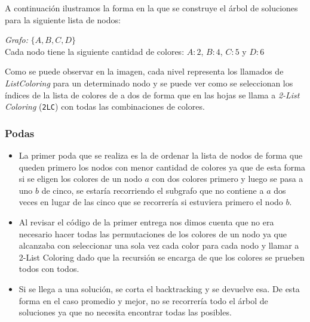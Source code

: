 A continuación ilustramos la forma en la que se construye el árbol de soluciones para la siguiente lista de nodos:

\begin{center}
\emph{Grafo:} $\{ A, B, C, D \}$\\
Cada nodo tiene la siguiente cantidad de colores: $A: 2$, $B:4$, $C:5$ y $D:6$
\end{center}

\begin{center}
\end{center}

Como se puede observar en la imagen, cada nivel representa los llamados de \emph{ListColoring} para un determinado nodo y se puede ver como se seleccionan los índices de la lista de colores de a dos de forma que en las hojas se llama a \emph{2-List Coloring} (\texttt{2LC}) con todas las combinaciones de colores.

\subsubsection{Podas}

\begin{itemize}
	\item La primer poda que se realiza es la de ordenar la lista de nodos de forma que queden primero los nodos con menor cantidad de colores ya que de esta forma si se eligen los colores de un nodo $a$ con dos colores primero y luego se pasa a uno $b$ de cinco, se estaría recorriendo el subgrafo que no contiene a $a$ dos veces en lugar de las cinco que se recorrería si estuviera primero el nodo $b$.
	
	\item Al revisar el código de la primer entrega nos dimos cuenta que no era necesario hacer todas las permutaciones de los colores de un nodo ya que alcanzaba con seleccionar una sola vez cada color para cada nodo y llamar a 2-List Coloring dado que la recursión se encarga de que los colores se prueben todos con todos.
	
	\item Si se llega a una solución, se corta el backtracking y se devuelve esa. De esta forma en el caso promedio y mejor, no se recorrería todo el árbol de soluciones ya que no necesita encontrar todas las posibles.
\end{itemize}

